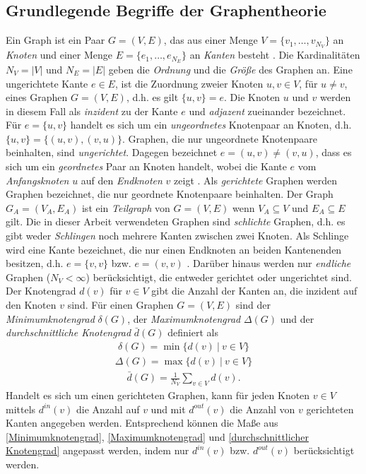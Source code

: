 \documentclass[12pt, a4paper]{report}\usepackage[]{graphicx}\usepackage[]{color}
\begin{document}
\subsection{Grundlegende Begriffe der Graphentheorie}\label{Kap_Grundlegende Begriffe der Graphentheorie}
Ein Graph ist ein Paar $G=(V,E)$, das aus einer Menge $V=\{v_1,\dots,v_{N_V}\}$ an \textit{Knoten} und einer Menge $E=\{e_1,\dots,e_{N_E}\}$ an \textit{Kanten} besteht \cite{brandes2005graphfunda}. Die Kardinalitäten $N_V =|V|$ und $N_E=|E|$ geben die \textit{Ordnung} und die \textit{Größe} des Graphen an. Eine ungerichtete Kante $e \in E$, ist die Zuordnung zweier Knoten $u,v \in V$, für $u \neq v$, eines Graphen $G=(V,E)$, d.h. es gilt $\{u,v\} = e$. Die Knoten $u$ und $v$ werden in diesem Fall als \textit{inzident} zu der Kante $e$ und \textit{adjazent} zueinander bezeichnet. Für $e=\{u,v\}$ handelt es sich um ein \textit{ungeordnetes} Knotenpaar an Knoten, d.h. $\{u,v\}=\{(u,v),(v,u)\}$. Graphen, die nur ungeordnete Knotenpaare beinhalten, sind \textit{ungerichtet}. Dagegen bezeichnet $e=(u,v) \neq (v,u)$, dass es sich um ein \textit{geordnetes} Paar an Knoten handelt, wobei die Kante $e$ vom \textit{Anfangsknoten} $u$ auf den \textit{Endknoten} $v$ zeigt \cite{kolaczyk2009statistical}. Als \textit{gerichtete} Graphen werden Graphen bezeichnet, die nur geordnete Knotenpaare beinhalten. Der Graph $G_A=(V_A,E_A)$ ist ein \textit{Teilgraph} von $G=(V,E)$ wenn $V_A \subseteq V$ und $E_A \subseteq E$ gilt. Die in dieser Arbeit verwendeten Graphen sind \textit{schlichte} Graphen, d.h. es gibt weder \textit{Schlingen} noch mehrere Kanten zwischen zwei Knoten. Als Schlinge wird eine Kante bezeichnet, die nur einen Endknoten an beiden Kantenenden besitzen, d.h. $e=\{v,v\}$ bzw. $e=(v,v)$ \cite{tittmann2011graphen}. Darüber hinaus werden nur \textit{endliche} Graphen ($N_V < \infty$) berücksichtigt, die entweder gerichtet oder ungerichtet sind.\\

Der Knotengrad $d(v)$ für $v \in V$ gibt die Anzahl der Kanten an, die inzident auf den Knoten $v$ sind. Für einen Graphen $G=(V,E)$ sind der \textit{Minimumknotengrad} $\delta(G)$, der \textit{Maximumknotengrad} $\Delta(G)$ und der \textit{durchschnittliche Knotengrad} $\bar{d}(G)$ definiert \cite{diestel2006graph} als
\begin{align}
\delta(G)=\min\{d(v) \ | \ v \in V\}\label{Minimumknotengrad}
\end{align}
\begin{align}
\Delta(G)=\max\{d(v) \ | \ v \in V\}\label{Maximumknotengrad}
\end{align}
\begin{align}
\bar{d}(G)=\frac{1}{N_V}\sum_{v \in V}d(v).\label{durchschnittlicher Knotengrad}
\end{align}
Handelt es sich um einen gerichteten Graphen, kann für jeden Knoten $v \in V$ mittels $d^{in}(v)$ die Anzahl auf $v$ und mit $d^{out}(v)$ die Anzahl von $v$ gerichteten Kanten angegeben werden. Entsprechend können die Maße aus \eqref{Minimumknotengrad}, \eqref{Maximumknotengrad} und \eqref{durchschnittlicher Knotengrad} angepasst werden, indem nur $d^{in}(v)$ bzw. $d^{out}(v)$ berücksichtigt werden.\\
\end{document}
